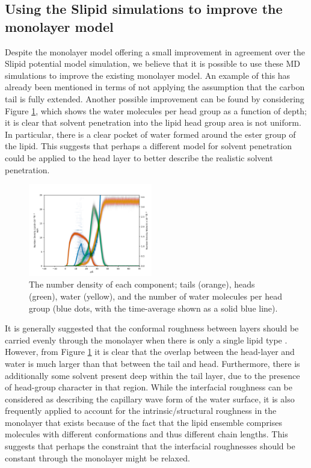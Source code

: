 \documentclass[amsmath,amssymb,twocolumn,superscriptaddress]{revtex4-1}
\begin{document}
\subsection{Using the Slipid simulations to improve the monolayer model}
Despite the monolayer model offering a small improvement in agreement over
the Slipid potential model simulation, we believe that it is possible to use
these MD simulations to improve the existing monolayer model.
An example of this has already been mentioned in terms of not applying the
assumption that the carbon tail is fully extended.
Another possible improvement can be found by considering Figure
\ref{fig:nb}, which shows the water molecules per head group as a function
of depth; it is clear that solvent penetration into the lipid head group
area is not uniform.
In particular, there is a clear pocket of water formed around the ester
group of the lipid.
This suggests that perhaps a different model for solvent penetration could
be applied to the head layer to better describe the realistic solvent
penetration.
%
\begin{figure}
\centering
  \includegraphics[width=0.48\textwidth]{number_density}
  \caption{The number density of each component; tails (orange), heads
  (green), water (yellow), and the number of water molecules per head
  group (blue dots, with the time-average shown as a solid blue line).}
  \label{fig:nb}
\end{figure}
%

It is generally suggested that the conformal roughness between layers
should be carried evenly through the monolayer when there is only a single
lipid type \cite{campbell_structure_2018}.
However, from Figure \ref{fig:nb} it is clear that the overlap between the
head-layer and water is much larger than that between the tail and head.
Furthermore, there is additionally some solvent present deep within the tail
layer, due to the presence of head-group character in that region.
While the interfacial roughness can be considered as describing the capillary
wave form of the water surface, it is also frequently applied to account
for the intrinsic/structural roughness in the monolayer that exists because
of the fact that the lipid ensemble comprises molecules with different
conformations and thus different chain lengths.
This suggests that perhaps the constraint that the interfacial roughnesses
should be constant through the monolayer might be relaxed.
\end{document}
